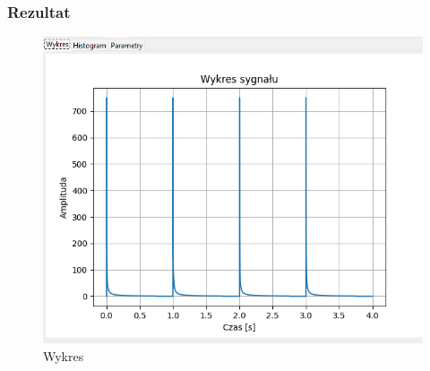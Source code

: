 \documentclass{article}
\begin{document}
\subsubsection{Rezultat}
\begin{figure}[h!]
    \centering
    \includegraphics[width=\textwidth]{img/div/wykres.png}
    \caption{Wykres}
\end{figure}
\end{document}

